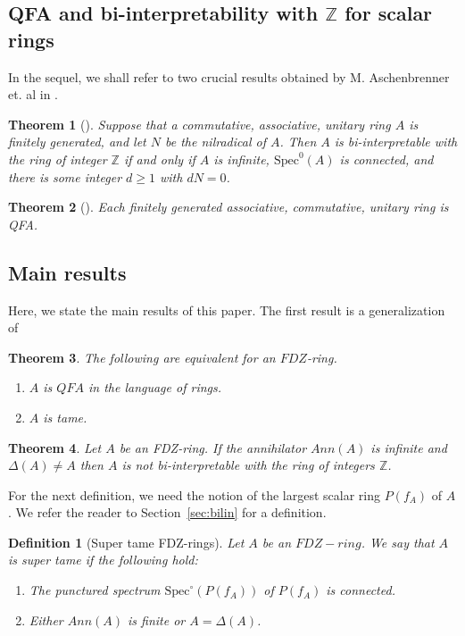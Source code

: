 \documentclass{article}
\newtheorem{theorem}{Theorem}[section]
\newtheorem{definition}{Definition}[section]
\theoremstyle{remark}
\def\Z{{\mathbb{Z}}}
\begin{document}
\subsection{QFA and bi-interpretability with \texorpdfstring{$\Z$}{Z} for scalar rings}
In the sequel, we shall refer to two crucial results obtained by M. Aschenbrenner et. al in \cite{AKNS}.

\begin{theorem}[\cite{AKNS}]\label{AKNS1} Suppose that a commutative, associative, unitary ring $A$ is finitely generated, and let $N$ be the nilradical of $A$. Then $A$ is bi-interpretable with the ring of integer $\Z$  if and only if $A$ is infinite, $\text{Spec}^0(A)$ is connected, and there is some integer $d\geq 1$ with $dN=0$.   
\end{theorem}
\begin{theorem}[\cite{AKNS}]\label{AKNS2} Each finitely generated associative, commutative, unitary ring is QFA.
\end{theorem}
\subsection{Main results}
Here, we state the main results of this paper. The first result is a generalization of
\begin{theorem}\label{thm:Main1} The following are equivalent for an $FDZ$-ring.
\begin{enumerate}
    \item $A$ is $QFA$ in the language of rings.
    \item $A$ is tame.
\end{enumerate}
\end{theorem}
\begin{theorem}\label{thm:main2}  Let $A$ be an FDZ-ring. If the annihilator $Ann(A)$ is infinite and $\Delta(A)\neq A$ then $A$ is not bi-interpretable with the ring of integers $\Z$.\end{theorem}
For the next definition, we need the notion of the largest scalar ring $P(f_A)$ of $A$. We refer the reader to Section~\ref{sec:bilin} for a definition.
\begin{definition}[Super tame FDZ-rings] Let $A$ be an $FDZ-ring$. We say that $A$ is super tame if the following hold:
\begin{enumerate}
\item The punctured spectrum $\text{Spec}^\circ(P(f_A))$ of $P(f_A)$ is connected.
\item Either $Ann(A)$ is finite or $A=\Delta(A)$.
\end{enumerate}
 \end{definition}
\end{document}
